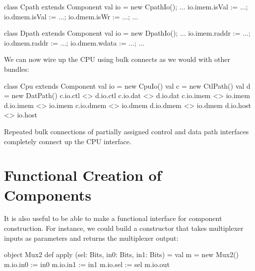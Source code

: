 \documentclass[twocolumn,10pt]{article}
\begin{document}
\begin{scala}
class Cpath extends Component {
  val io = new CpathIo();
  ...
  io.imem.isVal := ...;
  io.dmem.isVal := ...;
  io.dmem.isWr  := ...;
  ...
}

class Dpath extends Component {
  val io = new DpathIo();
  ...
  io.imem.raddr := ...;
  io.dmem.raddr := ...;
  io.dmem.wdata := ...;
  ...
}
\end{scala}

\noindent
We can now wire up the CPU using bulk connects as we would with other bundles:

\begin{scala}
class Cpu extends Component {
  val io = new CpuIo()
  val c  = new CtlPath()
  val d  = new DatPath()
  c.io.ctl  <> d.io.ctl
  c.io.dat  <> d.io.dat
  c.io.imem <> io.imem
  d.io.imem <> io.imem
  c.io.dmem <> io.dmem
  d.io.dmem <> io.dmem
  d.io.host <> io.host
}
\end{scala}

\noindent
Repeated bulk connections of partially assigned control and data path interfaces
completely connect up the CPU interface.

%
%
%
%
%

\section{Functional Creation of Components}
\label{sec:funconstructor}

It is also useful to be able to make a functional interface for
component construction.  For instance, we could build a constructor
that takes multiplexer inputs as parameters and returns the
multiplexer output:

\begin{scala}
object Mux2 {
  def apply (sel: Bits, in0: Bits, in1: Bits) = {
    val m = new Mux2()
    m.io.in0 := in0
    m.io.in1 := in1
    m.io.sel := sel
    m.io.out
  }
}
\end{scala}
\end{document}
